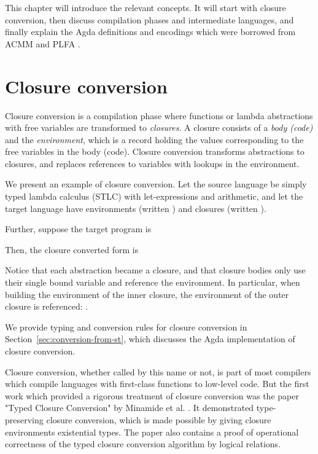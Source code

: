 \documentclass[bsc,frontabs,oneside,singlespacing,parskip,deptreport]{infthesis}
\theoremstyle{definition}
\theoremstyle{lemma}
\begin{document}
This chapter will introduce the relevant concepts. It will start with
closure conversion, then discuss compilation phases and intermediate
languages, and finally explain the Agda definitions and encodings
which were borrowed from ACMM \cite{DBLP:journals/pacmpl/AllaisA0MM18}
and PLFA \cite{DBLP:conf/sbmf/Wadler18}.

\section{Closure conversion}
\label{sec:closure-conversion}

Closure conversion is a compilation phase where functions or lambda
abstractions with free variables are transformed to
\textit{closures}. A closure consists of a \textit{body (code)} and
the \textit{environment}, which is a record holding the values
corresponding to the free variables in the body (code). Closure
conversion transforms abstractions to closures, and replaces
references to variables with lookups in the environment.

We present an example of closure conversion. Let the source language
be simply typed lambda calculus (STLC) with let-expressions and
arithmetic, and let the target language have environments (written
) and closures (written ).

Further, suppose the target program is


Then, the closure converted form is


Notice that each abstraction became a closure, and that closure bodies
only use their single bound variable and reference the environment. In
particular, when building the environment of the inner closure, the
environment of the outer closure is referenced: .

We provide typing and conversion rules for closure conversion in
Section~\ref{sec:conversion-from-st}, which discusses the Agda
implementation of closure conversion.

Closure conversion, whether called by this name or not, is part of
most compilers which compile languages with first-class functions to
low-level code. But the first work which provided a rigorous treatment
of closure conversion was the paper "Typed Closure Conversion" by
Minamide et al. \cite{TODO}. It demonstrated type-preserving closure
conversion, which is made possible by giving closure
environments existential types. The paper also contains a proof of
operational correctness of the typed closure conversion algorithm by
logical relations.
\end{document}
